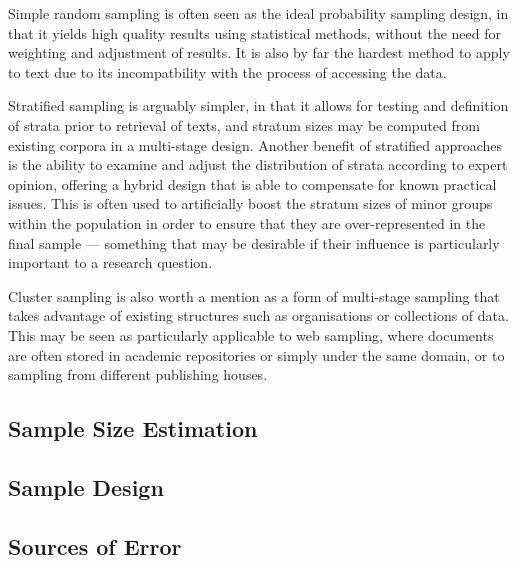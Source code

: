 Simple random sampling is often seen as the ideal probability sampling design, in that it yields high quality results using statistical methods, without the need for weighting and adjustment of results.  It is also by far the hardest method to apply to text due to its incompatbility with the process of accessing the data.

Stratified sampling is arguably simpler, in that it allows for testing and definition of strata prior to retrieval of texts, and stratum sizes may be computed from existing corpora in a multi-stage design.  Another benefit of stratified approaches is the ability to examine and adjust the distribution of strata according to expert opinion, offering a hybrid design that is able to compensate for known practical issues.  This is often used to artificially boost the stratum sizes of minor groups within the population in order to ensure that they are over-represented in the final sample --- something that may be desirable if their influence is particularly important to a research question.

Cluster sampling is also worth a mention as a form of multi-stage sampling that takes advantage of existing structures such as organisations or collections of data.  This may be seen as particularly applicable to web sampling, where documents are often stored in academic repositories or simply under the same domain, or to sampling from different publishing houses.



\subsection{Sample Size Estimation}

\subsection{Sample Design}

\subsection{Sources of Error}

